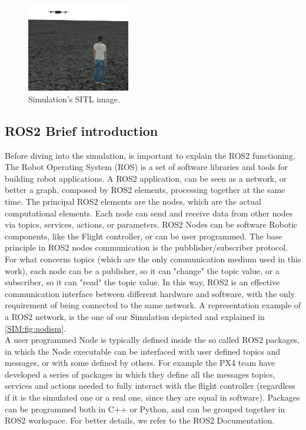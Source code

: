 \begin{figure}
    \centering
    \includegraphics[width=0.4\textwidth]{images/screen_simulazione.png}
    \caption{Simulation's SITL image.}
    \label{SOL:fig:screensimulazione}
\end{figure}

\subsection{ROS2 Brief introduction}
Before diving into the simulation, is important to explain the ROS2 functioning. The Robot Operating System (ROS) is a set of software libraries and tools for building robot applications. A ROS2 application, can be seen as a network, or better a graph, composed by ROS2 elements, processing together at the same time. The principal ROS2 elements are the nodes, which are the actual computational elements. Each node can send and receive data from other nodes via topics, services, actions, or parameters. ROS2 Nodes can be software Robotic components, like the Flight controller, or can be user programmed. The base principle in ROS2 nodes communication is the pubblisher/subscriber protocol. For what concerns topics (which are the only communication medium used in this work), each node can be a publisher, so it can "change" the topic value, or a subscriber, so it can "read" the topic value. In this way, ROS2 is an effective communication interface between different hardware and software, with the only requirement of being connected to the same network. A representation example of a ROS2 network, is the one of our Simulation depicted and explained in \autoref{SIM:fig:nodism}.\\
A user programmed Node is typically defined inside the so called ROS2 packages, in which the Node executable can be interfaced with user defined topics and messages, or with some defined by others. For example the PX4 team have developed a series of packages in which they define all the messages topics, services and actions needed to fully interact with the flight controller (regardless if it is the simulated one or a real one, since they are equal in software). Packages can be programmed both in C++ or Python, and can be grouped together in ROS2 workspace. For better details, we refer to the ROS2 Documentation\cite{ros2doc}.

